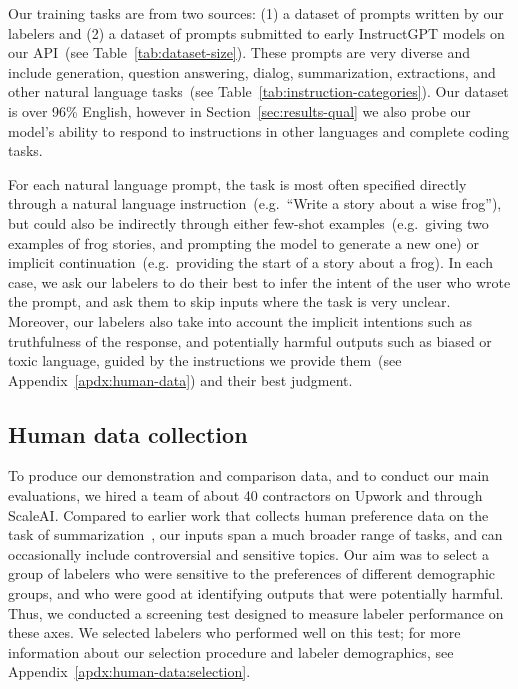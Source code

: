 \documentclass{article}
\begin{document}
Our training tasks are from two sources: (1) a dataset of prompts written by our labelers and (2) a dataset of prompts submitted to early InstructGPT models on our API~(see Table~\ref{tab:dataset-size}). These prompts are very diverse and include generation, question answering, dialog, summarization, extractions, and other natural language tasks~(see Table~\ref{tab:instruction-categories}). Our dataset is over 96\% English, however in Section~\ref{sec:results-qual} we also probe our model's ability to respond to instructions in other languages and complete coding tasks.

For each natural language prompt, the task is most often specified directly through a natural language instruction~(e.g.\ ``Write a story about a wise frog''), but could also be indirectly through either few-shot examples~(e.g.\ giving two examples of frog stories, and prompting the model to generate a new one) or implicit continuation~(e.g.\ providing the start of a story about a frog). In each case, we ask our labelers to do their best to infer the intent of the user who wrote the prompt, and ask them to skip inputs where the task is very unclear. Moreover, our labelers also take into account the implicit intentions such as truthfulness of the response, and potentially harmful outputs such as biased or toxic language, guided by the instructions we provide them~(see Appendix~\ref{apdx:human-data}) and their best judgment.


\subsection{Human data collection}
\label{sec:human-data}

To produce our demonstration and comparison data, and to conduct our main evaluations, we hired a team of about 40 contractors on Upwork and through ScaleAI. Compared to earlier work that collects human preference data on the task of summarization~\citep{ziegler2019fine,stiennon2020learning,wu2021recursively}, our inputs span a much broader range of tasks, and can occasionally include controversial and sensitive topics. Our aim was to select a group of labelers who were sensitive to the preferences of different demographic groups, and who were good at identifying outputs that were potentially harmful. Thus, we conducted a screening test designed to measure labeler performance on these axes. We selected labelers who performed well on this test; for more information about our selection procedure and labeler demographics, see Appendix~\ref{apdx:human-data:selection}. 
\end{document}
